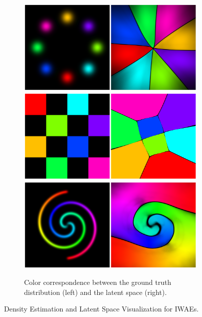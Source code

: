 \documentclass{article}
\begin{document}
\begin{figure}[t]
\begin{subfigure}[b]{0.48\textwidth}
        \centering
                \includegraphics[width=\linewidth]{figures/color8g_iwae.png}
                \includegraphics[width=\linewidth]{figures/colorc_iwae.png}
                \includegraphics[width=\linewidth]{figures/color2s_iwae.png}
        \caption{Color correspondence between the ground truth distribution (left) and the latent space (right).}
        \label{fig:latent_iwae}
    \end{subfigure}
    \caption{Density Estimation and Latent Space Visualization for IWAEs.}
    \label{fig:iwae}
\end{figure}
\end{document}
